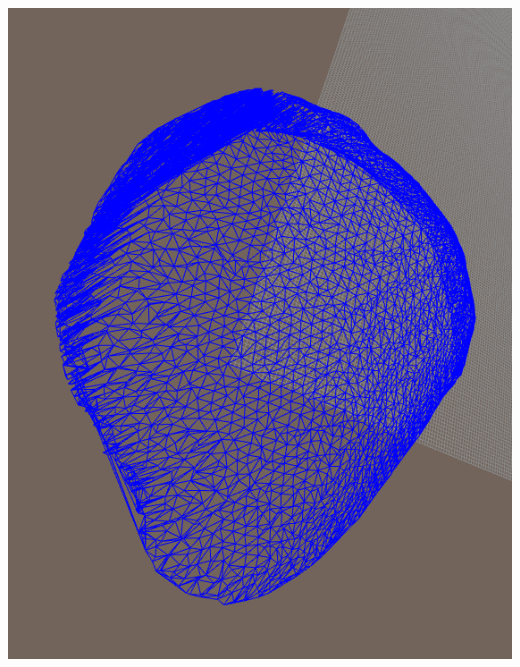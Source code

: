 \documentclass[a4paper, 12pt]{article}   	%
\begin{document}
    \begin{center}
        \begin{minipage}{0.7\linewidth}
            \includegraphics[width=\linewidth]{img/up_view_above_1}
        \end{minipage}
    \end{center}
\end{document}
